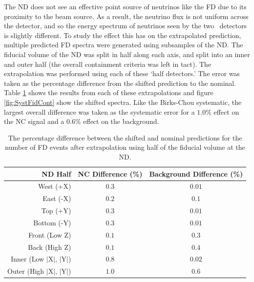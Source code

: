 The ND does not see an effective point source of neutrinos like the FD due to its proximity to the beam source. As a result, the neutrino flux is not uniform across the detector, and so the energy spectrum of neutrinos seen by the two \nova~detectors is slightly different. To study the effect this has on the extrapolated prediction, multiple predicted FD spectra were generated using subsamples of the ND. The fiducial volume of the ND was split in half along each axis, and split into an inner and outer half (the overall containment criteria was left in tact). The extrapolation was performed using each of these `half detectors.' The error was taken as the percentage difference from the shifted prediction to the nominal. Table \ref{tab:SystFidCont} shows the results from each of these extrapolations and figure \ref{fig:SystFidCont} show the shifted spectra. Like the Birks-Chou systematic, the largest overall difference was taken as the systematic error for a $1.0\%$ effect on the NC signal and a $0.6\%$ effect on the background.
\begin{table}[htb]
  \begin{center}
    \begin{tabular}{r c c}
      \hline\hline
      ND Half & NC Difference (\%) & Background Difference (\%) \\
      \hline
      West (+X) & $0.3$ & $0.01$ \\
      East (-X) & $0.2$ & $0.1$ \\
      Top (+Y) & $0.3$ & $0.01$ \\
      Bottom (-Y) & $0.3$ & $0.01$ \\
      Front (Low Z) & $0.1$ & $0.3$ \\
      Back (High Z) & $0.1$ & $0.4$ \\
      Inner (Low $\vert$X$\vert$, $\vert$Y$\vert$) & $0.8$ & $0.02$ \\
      Outer (High $\vert$X$\vert$, $\vert$Y$\vert$) & $1.0$ & $0.6$ \\
      \hline
    \end{tabular}
    \caption[ND Containment Systematic Errors]{The percentage difference between the shifted and nominal predictions for the number of FD events after extrapolation using half of the fiducial volume at the ND.}
    \label{tab:SystFidCont}
  \end{center}
\end{table}

